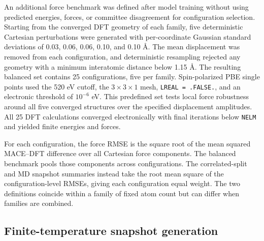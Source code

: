 \documentclass[12pt]{article}
\begin{document}
An additional force benchmark was defined after model training without using
predicted energies, forces, or committee disagreement for configuration
selection. Starting from the converged DFT geometry of each family, five
deterministic Cartesian perturbations were generated with per-coordinate
Gaussian standard deviations of 0.03, 0.06, 0.06, 0.10, and 0.10 \AA{}.
The mean displacement was removed from each configuration, and deterministic
resampling rejected any geometry with a minimum interatomic distance below
1.15 \AA{}. The resulting balanced set contains 25 configurations, five per
family. Spin-polarized PBE single points used the 520 eV cutoff, the
$3\times3\times1$ mesh,
\texttt{LREAL = .FALSE.}, and an electronic threshold of $10^{-6}$ eV. This
predefined set tests local force robustness around all five converged
structures over the specified displacement amplitudes. All 25 DFT
calculations converged electronically with final iterations below
\texttt{NELM} and yielded finite energies and forces.

For each configuration, the force RMSE is the square root of the mean squared
MACE--DFT difference over all Cartesian force components. The balanced benchmark
pools those components across configurations. The correlated-split and MD
snapshot summaries instead take the root mean square of the configuration-level
RMSEs, giving each configuration equal weight. The two definitions coincide
within a family of fixed atom count but can differ when families are combined.

\subsection{Finite-temperature snapshot generation}
\end{document}
